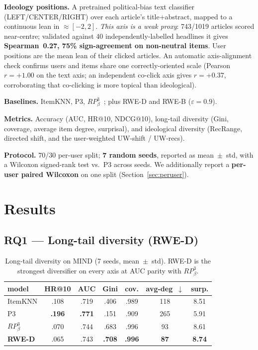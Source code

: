 \documentclass[sigconf,nonacm]{acmart}
\begin{document}
\textbf{Ideology positions.} A pretrained political-bias text
classifier~\cite{baly2020detect} (LEFT/CENTER/RIGHT) over each article's
title+abstract, mapped to a continuous lean in $\approx[-2,2]$. \emph{This axis is
a weak proxy}: 743/1019 articles scored near-centre; validated against 40
independently-labelled headlines it gives \textbf{Spearman~0.27, 75\%
sign-agreement on non-neutral items}. User positions are the mean lean of their
clicked articles. An automatic axis-alignment check confirms users and items share
one correctly-oriented scale (Pearson $r{=}{+}1.00$ on the text axis; an
independent co-click axis gives $r{=}{+}0.37$, corroborating that co-clicking is
more topical than ideological).

\textbf{Baselines.} ItemKNN, P3, $RP^3_\beta$~\cite{paudel2017rp3beta}; plus RWE-D
and RWE-B ($\varepsilon=0.9$).

\textbf{Metrics.} Accuracy (AUC, HR@10, NDCG@10), long-tail diversity (Gini,
coverage, average item degree, surprisal), and ideological diversity (RecRange,
directed shift, and the user-weighted UW-shift / UW-recs).

\textbf{Protocol.} 70/30 per-user split; \textbf{7 random seeds}, reported as
mean~$\pm$~std, with a Wilcoxon signed-rank test vs.\ P3 across seeds. We
additionally report a \textbf{per-user paired Wilcoxon} on one split (Section~\ref{sec:peruser}).

\section{Results}
\label{sec:results}

\subsection{RQ1 --- Long-tail diversity (RWE-D)}
\begin{table}[t]
  \centering
  \caption{Long-tail diversity on MIND (7 seeds, mean~$\pm$~std). RWE-D is the
  strongest diversifier on every axis at AUC parity with $RP^3_\beta$.}
  \label{tab:rq1}
  \small
  \begin{tabular}{lcccccc}
    \toprule
    model & HR@10 & AUC & Gini & cov. & avg-deg~$\downarrow$ & surp. \\
    \midrule
    ItemKNN & .108 & .719 & .406 & .989 & 118 & 8.51 \\
    P3      & \textbf{.196} & \textbf{.771} & .151 & .909 & 265 & 5.91 \\
    $RP^3_\beta$ & .070 & .744 & .683 & .996 & 93 & 8.61 \\
    \textbf{RWE-D} & .065 & .743 & \textbf{.708} & \textbf{.996} & \textbf{87} & \textbf{8.74} \\
    \bottomrule
  \end{tabular}
\end{table}
\end{document}
